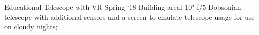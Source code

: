 \project
    {Educational Telescope with VR}
    {Spring `18}
    {
        Building areal 10" f/5 Dobsonian telescope with additional sensors and a screen to emulate
        telescope usage for use on cloudy nights;
    }
